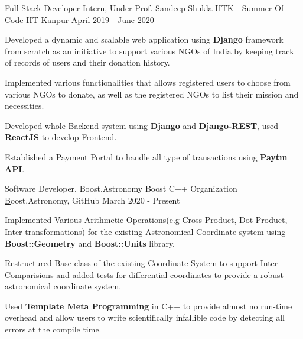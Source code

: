 \begin{cventries}
    
    \cventry
    {Full Stack Developer Intern, Under Prof. Sandeep Shukla}
    {IITK - Summer Of Code}
    {IIT Kanpur}
    {April 2019 - June 2020}
    {
      \begin{cvitems}
        \item {Developed a dynamic and scalable web application using \textbf{Django} framework from scratch as an initiative to support various NGOs of India by keeping track of records of users and their donation history.}
        \item{Implemented various functionalities that allows registered users to choose from various NGOs to donate, as well as the registered NGOs	to list their mission and necessities.}
        \item{Developed whole Backend system using \textbf{Django} and \textbf{Django-REST}, used \textbf{ReactJS} to develop Frontend.}
        \item{Established a Payment Portal to handle all type of transactions using \textbf{Paytm API}.}
      \end{cvitems}
    }
        
    \cventry
    {Software Developer, Boost.Astronomy}
    {Boost C++ Organization}
    {\href{https://github.com/BoostGSoC19/astronomy}Boost.Astronomy, GitHub}
    {March 2020 - Present}
    {
      \begin{cvitems}
        \item {Implemented Various Arithmetic Operations(e.g Cross Product, Dot Product, Inter-transformations) for the  existing Astronomical Coordinate system using \textbf{Boost::Geometry} and \textbf{Boost::Units} library.}
        \item {Restructured Base class of the existing Coordinate System to support Inter-Comparisions and added tests for differential coordinates to provide a robust astronomical coordinate system.}
        \item{Used \textbf{Template Meta Programming} in C++ to provide almost no run-time overhead and allow users to write scientifically infallible code by detecting all errors at the compile time.}
      \end{cvitems}
    }
  
  
\end{cventries}